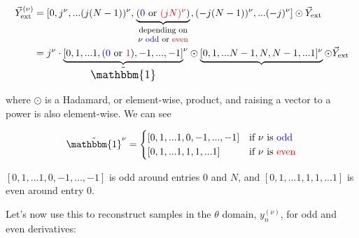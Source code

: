 \documentclass[10pt]{article}
\begin{document}
\begin{align*}
\vec{Y}_{\text{ext}}^{(\nu)} &= [0, j^\nu, ... (j(N-1))^\nu, \underbrace{(\color{blue}0\color{black} \text{ or } \color{red}(jN)^\nu\color{black})}_{\parbox{20mm}{\footnotesize \centering depending on $\nu$ \color{blue}odd \color{black} or \color{red}even}}, (-j(N-1))^\nu, ... (-j)^\nu] \odot \vec{Y}_{\text{ext}}\\
&= j^\nu \cdot {\underbrace{[0, 1, ... 1, (\color{blue}0 \color{black}\text{ or }\color{red} 1\color{black}), -1, ..., -1]}_{\text{\large $\tilde{\mathbbm{1}}$}}}^\nu \odot \underbrace{[0, 1, ... N-1, N, N-1, ... 1]^\nu} \odot \vec{Y}_{\text{ext}}
\end{align*}

where $\odot$ is a Hadamard, or element-wise, product, and raising a vector to a power is also element-wise. We can see

$$\tilde{\mathbbm{1}}^\nu = \begin{cases} [0, 1, ... 1, 0, -1, ..., -1] & \text{if $\nu$ is \color{blue}odd}\\ [0, 1, ... 1, 1, 1, ... 1] & \text{if $\nu$ is \color{red}even}\end{cases}$$

$[0, 1, ... 1, 0, -1, ..., -1]$ is odd around entries $0$ and $N$, and $[0, 1, ... 1, 1, 1, ... 1]$ is even around entry $0$.\newline

Let's now use this to reconstruct samples in the $\theta$ domain, $y_n^{(\nu)}$, for odd and even derivatives:\vspace{-5mm}
\end{document}
